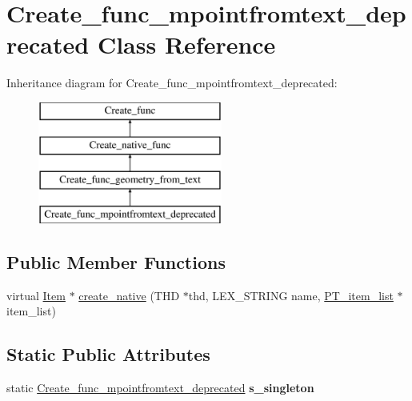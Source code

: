\hypertarget{classCreate__func__mpointfromtext__deprecated}{}\section{Create\+\_\+func\+\_\+mpointfromtext\+\_\+deprecated Class Reference}
\label{classCreate__func__mpointfromtext__deprecated}
Inheritance diagram for Create\+\_\+func\+\_\+mpointfromtext\+\_\+deprecated\+:\begin{figure}[H]
\begin{center}
\leavevmode
\includegraphics[height=4.000000cm]{classCreate__func__mpointfromtext__deprecated}
\end{center}
\end{figure}
\subsection*{Public Member Functions}
\begin{DoxyCompactItemize}
\item 
virtual \mbox{\hyperlink{classItem}{Item}} $\ast$ \mbox{\hyperlink{classCreate__func__mpointfromtext__deprecated_a51dc673c0da67b8c4cc35ede863275aa}{create\+\_\+native}} (T\+HD $\ast$thd, L\+E\+X\+\_\+\+S\+T\+R\+I\+NG name, \mbox{\hyperlink{classPT__item__list}{P\+T\+\_\+item\+\_\+list}} $\ast$item\+\_\+list)
\end{DoxyCompactItemize}
\subsection*{Static Public Attributes}
\begin{DoxyCompactItemize}
\item 
\mbox{\label{classCreate__func__mpointfromtext__deprecated_ac339965bcb7be4968229f003d71931cc}} 
static \mbox{\hyperlink{classCreate__func__mpointfromtext__deprecated}{Create\+\_\+func\+\_\+mpointfromtext\+\_\+deprecated}} {\bfseries s\+\_\+singleton}
\end{DoxyCompactItemize}
